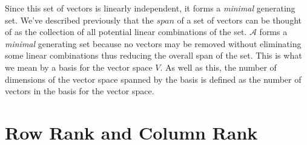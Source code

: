 \documentclass[a4paper,12pt]{book}
\newcommand{\set}[1]{\mathcal{#1}}
\newcommand{\italic}[1]{\textit{#1}}
\begin{document}
	Since this set of vectors is linearly independent, it forms a \italic{minimal} generating set. We've described previously that the $ span $ of a set of vectors can be thought of as the collection of all potential linear combinations of the set. $ \set{A} $ forms a \italic{minimal} generating set because no vectors may be removed without eliminating some linear combinations thus reducing the overall span of the set. This is what we mean by a basis for the vector space $ V $. 
	As well as this, the number of dimensions of the vector space spanned by the basis is defined as the number of vectors in the basis for the vector space.
	\section{Row Rank and Column Rank}
	
\end{document}
